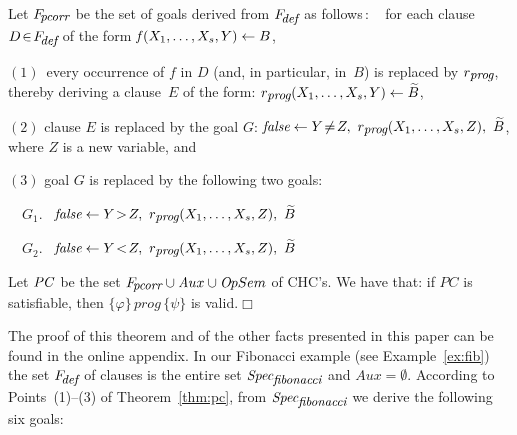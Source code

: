 \documentclass[english]{tlp}
\newcommand{\eop}{\hfill$\Box$}
\begin{document}
\vspace{-2mm}



\begin{theorem}\label{thm:pc}
Let $F_{\!\textit{\small pcorr}}$ be the set of goals derived from 
$F_{\!\textit{\small def}}$ as follows$\,:$\ \ 
for each clause $D\!\in\! F_{\!\textit{\small def}}$ of the form 
$\textit{f\/}(X_1,\ldots,X_s,Y) \leftarrow B$,

\noindent
\hangindent=5.5mm
$(1)$~every occurrence of $f$ in $D$ 
(and, in particular, in~$B$) is replaced by $r_{\textit{\small prog}}$, 
thereby deriving a clause~$E$ of the form\/: 
$r_{\textit{\small prog}}(X_1,\ldots,X_s,Y) \leftarrow \widetilde{B}$, 

\noindent
\hangindent=5.5mm
$(2)$ clause $E$ is replaced by the goal $G$: 
$\textit{false}\leftarrow Y\!\neq\! Z,\  
r_{\textit{\small prog}}(X_1,\ldots,X_s,Z),\ \widetilde{B}$, where $Z$ is a new variable, and



\noindent
\hangindent=0mm
$(3)$  goal $G$ is replaced by the following two goals:



~~$G_1$.~ $\textit{false} \leftarrow Y\!>\! Z,\ 
r_{\textit{\small prog}}(X_1,\ldots,X_s,Z),\ \widetilde{B}$

~~$G_2$.~ $\textit{false} \leftarrow Y\!<\! Z,\ 
r_{\textit{\small prog}}(X_1,\ldots,X_s,Z),\ \widetilde{B}$





\hangindent=0mm
\noindent
Let ${\textit{PC\/}}$ be the set 
$F_{\!\textit{\small{pcorr}}} \/\cup {\textit Aux} \cup {\textit OpSem}$ of CHC's.
We have that: if ${\textit{PC}}$ is satisfiable,
then \mbox{$\{\varphi\}\,{\textit{prog}}\,\{\psi\}$} 
is valid.\eop
\end{theorem}

\vspace{-1mm}
\noindent
The proof of this theorem and of the other facts presented in this
paper can be found in the online appendix.
In our Fibonacci example  (see Example~\ref{ex:fib})
 the set  $F_{\!\textit{\small def}}$ of clauses 
is the entire set $\textit{Spec}_{\textit{\small fibonacci}}$ 
and $\textit{Aux}\!=\!\emptyset$. 
According to Points~(1)--(3) of Theorem~\ref{thm:pc},
from $\textit{Spec}_{\textit{\small fibonacci}}$ we derive the following six 
goals: 
\end{document}
